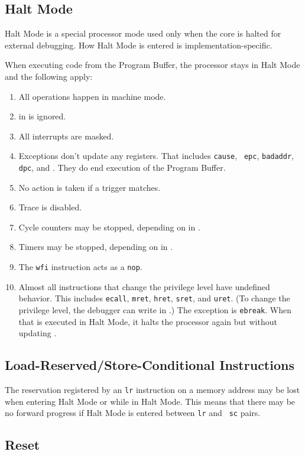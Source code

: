 \documentclass{article}
\newenvironment{steps}[1]
{
   \vspace{1ex}
   \noindent
   #1
   \begin{enumerate}[nosep]
}
{
   \end{enumerate}
   \vspace{1ex}
}
\begin{document}
\subsection{Halt Mode} \label{haltmode}

Halt Mode is a special processor mode used only when the core is halted for
external debugging. How Halt Mode is entered is implementation-specific.

\begin{steps}{When executing code from the Program Buffer, the processor stays
    in Halt Mode and the following apply:}
\item All operations happen in machine mode.
\item \Fmprv in \Rmstatus is ignored.
\item All interrupts are masked.
\item Exceptions don't update any registers.  That includes {\tt cause}, {\tt
    epc}, {\tt badaddr}, {\tt dpc}, and \Rmstatus. They do end execution of the
    Program Buffer.
\item No action is taken if a trigger matches.
\item Trace is disabled.
\item Cycle counters may be stopped, depending on \Fstopcycle in \Rdcsr.
\item Timers may be stopped, depending on \Fstoptime in \Rdcsr.
\item The {\tt wfi} instruction acts as a {\tt nop}.
\item Almost all instructions that change the privilege level have undefined
    behavior.  This includes {\tt ecall}, {\tt mret}, {\tt hret}, {\tt sret},
    and {\tt uret}.  (To change the privilege level, the debugger can write
    \Fprv in \Rdcsr.) The exception is {\tt ebreak}. When that is executed in
    Halt Mode, it halts the processor again but without updating \Rdpc.
\end{steps}

\subsection{Load-Reserved/Store-Conditional Instructions}

The reservation registered by an {\tt lr} instruction on a memory address may
be lost when entering Halt Mode or while in Halt Mode.  This means that there
may be no forward progress if Halt Mode is entered between {\tt lr} and {\tt
sc} pairs.

\subsection{Reset}
\end{document}
